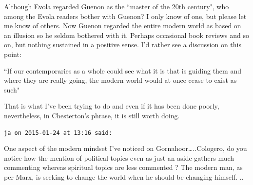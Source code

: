 \begin{footnotesize}
\begin{sffamily}
Although Evola regarded Guenon as the ``master of the 20th century", who among the Evola readers bother with Guenon? I only know of one, but please let me know of others. Now Guenon regarded the entire modern world as based on an illusion so he seldom bothered with it. Perhaps occasional book reviews and so on, but nothing sustained in a positive sense. I'd rather see a discussion on this point:

``If our contemporaries as a whole could see what it is that is guiding them and where they are really going, the modern world would at once cease to exist as such"

That is what I've been trying to do and even if it has been done poorly, nevertheless, in Chesterton's phrase, it is still worth doing.


\hfill

\texttt{ja on 2015-01-24 at 13:16 said: }

One aspect of the modern mindset I've noticed on Gornahoor…..Cologero, do you notice how the mention of political topics even as just an aside gathers much commenting whereas spiritual topics are less commented ? The modern man, as per Marx, is seeking to change the world when he should be changing himself. ..


\hfill


\end{sffamily}\end{footnotesize}

